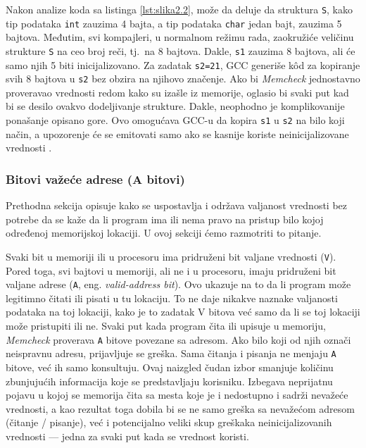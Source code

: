\documentclass[12pt,oneside]{memoir}
\theoremstyle{plain}
\theoremstyle{definition}
\begin{document}

Nakon analize koda sa listinga \ref{lst:slika2.2}, može da deluje da struktura \texttt{S}, kako tip podataka \texttt{int} zauzima 4 bajta, a tip podataka \texttt{char} jedan bajt, zauzima 5 bajtova. Međutim, svi kompajleri, u normalnom režimu rada, zaokružiće veličinu strukture \texttt{S} na ceo broj reči, tj.~na 8 bajtova. Dakle, \texttt{s1} zauzima 8 bajtova, ali će samo njih 5 biti inicijalizovano. Za zadatak \texttt{s2=21}, GCC generiše k\^od za kopiranje svih 8 bajtova u \texttt{s2} bez obzira na njihovo značenje. Ako bi \textit{Memcheck} jednostavno proveravao vrednosti redom kako su izašle iz memorije, oglasio bi svaki put kad bi se desilo ovakvo dodeljivanje strukture. Dakle, neophodno je komplikovanije ponašanje opisano gore. Ovo omogućava GCC-u da kopira \texttt{s1} u \texttt{s2} na bilo koji način, a upozorenje će se emitovati samo ako se kasnije koriste neinicijalizovane vrednosti \cite{Memcheck}. 

\subsubsection{Bitovi važeće adrese (A bitovi)}
Prethodna sekcija opisuje kako se uspostavlja i održava valjanost vrednosti bez potrebe da se kaže da li program ima ili nema pravo na pristup bilo kojoj određenoj memorijskoj lokaciji. U ovoj sekciji ćemo razmotriti to pitanje.

Svaki bit u memoriji ili u procesoru ima pridruženi bit valjane vrednosti (\texttt{V}). Pored toga, svi bajtovi u memoriji, ali ne i u procesoru, imaju pridruženi bit valjane adrese (\texttt{A}, eng. \textit{valid-address bit}). Ovo ukazuje na to da li program može legitimno čitati ili pisati u tu lokaciju. To ne daje nikakve naznake valjanosti podataka na toj lokaciji, kako je to zadatak V bitova već samo da li se toj lokaciji može pristupiti ili ne. Svaki put kada program čita ili upisuje u memoriju, \textit{Memcheck} proverava \texttt{A} bitove povezane sa adresom. Ako bilo koji od njih označi neispravnu adresu, prijavljuje se greška. Sama čitanja i pisanja ne menjaju \texttt{A} bitove, već ih samo konsultuju. Ovaj naizgled čudan izbor smanjuje količinu zbunjujućih informacija koje se predstavljaju korisniku. Izbegava neprijatnu pojavu u kojoj se memorija čita sa mesta koje je i nedostupno i sadrži nevažeće vrednosti, a kao rezultat toga dobila bi se ne samo greška sa nevažećom adresom (čitanje / pisanje), već i potencijalno veliki skup greškaka neinicijalizovanih vrednosti --- jedna za svaki put kada se vrednost koristi.
\end{document}

